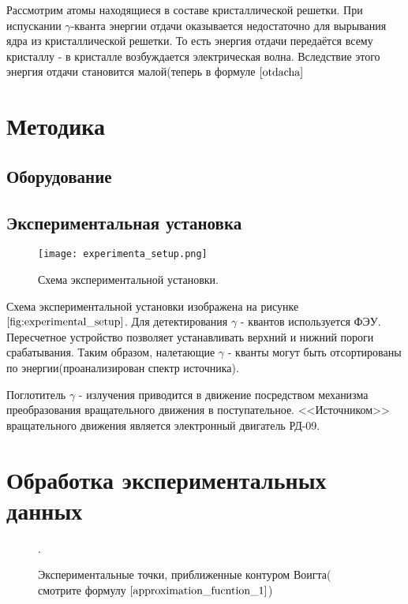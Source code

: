 \documentclass[a4paper, 14pt]{article}
\begin{document}
Рассмотрим атомы находящиеся в составе кристаллической решетки. 
При испускании $\gamma$-кванта энергии отдачи оказывается недостаточно
для вырывания ядра из кристаллической решетки. То есть энергия отдачи 
передаётся всему кристаллу - в кристалле возбуждается электрическая волна.
Вследствие этого энергия отдачи становится малой(теперь в формуле $\ref{otdacha}$

\section*{\textcolor{header}{Методика}}
\subsection*{\textcolor{sub_header}{Оборудование}}


\subsection*{\textcolor{sub_header}{Экспериментальная установка}}

\begin{figure}[hbtp]
    \begin{center}
        \texttt{[image: experimenta\_setup.png]}
        \caption{Схема экспериментальной установки.}
        \label{fig:experimental_setup}
    \end{center}
\end{figure}

Схема экспериментальной установки изображена на рисунке $\ref{fig:experimental_setup}$.
Для детектирования $\gamma$ - квантов используется ФЭУ. Пересчетное устройство позволяет
устанавливать верхний и нижний пороги срабатывания. Таким образом, налетающие $\gamma$ - кванты
могут быть отсортированы по энергии(проанализирован спектр источника).

Поглотитель $\gamma$ - излучения приводится в движение посредством механизма преобразования
вращательного движения в поступательное. <<Источником>> вращательного движения является
электронный двигатель РД-09.






\section*{\textcolor{header}{Обработка экспериментальных данных}}

\begin{figure}[hbtp]
    \begin{center}
        
    \end{center}
    \caption{Экспериментальные точки, приближенные контуром Воигта( смотрите формулу $\ref{approximation_fucntion_1}$)}.
    \label{fig:raw_data}
\end{figure}
\end{document}
